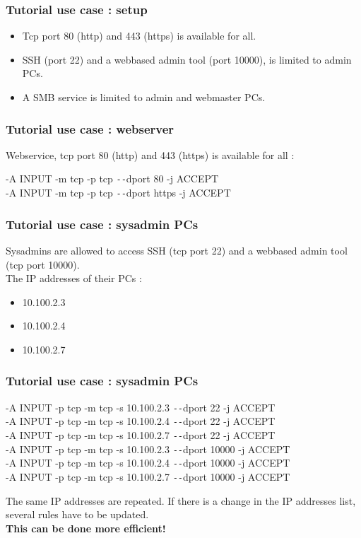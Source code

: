 \documentclass[14pt]{beamer}
\newcommand{\dd}{{\texttt{-{}-}}}
\begin{document}
  \begin{frame}
    \frametitle{Tutorial use case : setup}
    \begin{itemize}
      \item Tcp port 80 (http) and 443 (https) is available for all.
      \item SSH (port 22) and a webbased admin tool (port 10000), is limited to admin PCs.
      \item A SMB service is limited to admin and webmaster PCs.
    \end{itemize}
  \end{frame}
  \begin{frame}
    \frametitle{Tutorial use case : webserver}
    Webservice, tcp port 80 (http) and 443 (https) is available for all :
    \begin{example}
      \small{-A INPUT -m tcp -p tcp \dd dport 80 -j ACCEPT\\
      -A INPUT -m tcp -p tcp \dd dport https -j ACCEPT}
    \end{example}
  \end{frame}
  \begin{frame}
    \frametitle{Tutorial use case : sysadmin PCs}
    Sysadmins are allowed to access SSH (tcp port 22) and a webbased admin tool (tcp port 10000).\\
    The IP addresses of their PCs :
    \begin{itemize}
	\item 10.100.2.3
	\item 10.100.2.4
	\item 10.100.2.7
    \end{itemize}
  \end{frame}
  \begin{frame}
    \frametitle{Tutorial use case : sysadmin PCs}
    \begin{example}
      \small{-A INPUT -p tcp -m tcp -s 10.100.2.3 \dd dport 22 -j ACCEPT\\
      -A INPUT -p tcp -m tcp -s 10.100.2.4 \dd dport 22 -j ACCEPT\\
      -A INPUT -p tcp -m tcp -s 10.100.2.7 \dd dport 22 -j ACCEPT\\
      -A INPUT -p tcp -m tcp -s 10.100.2.3 \dd dport 10000 -j ACCEPT\\
      -A INPUT -p tcp -m tcp -s 10.100.2.4 \dd dport 10000 -j ACCEPT\\
      -A INPUT -p tcp -m tcp -s 10.100.2.7 \dd dport 10000 -j ACCEPT}
    \end{example}
    \pause
    The same IP addresses are repeated. If there is a change in the IP addresses list, several rules have to be updated.\\
    \pause
    \textbf{This can be done more efficient!}
  \end{frame}
\end{document}
